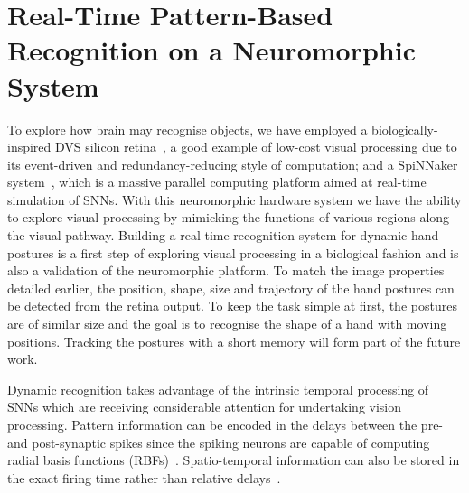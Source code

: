 \chapter{Real-Time Pattern-Based Recognition on a Neuromorphic System}
\label{cha:pattern}

To explore how brain may recognise objects, we have employed a biologically-inspired DVS silicon retina~\cite{lenero20113}, a good example of low-cost visual processing due to its event-driven and redundancy-reducing style of computation;
and a SpiNNaker system~\cite{furber2014spinnaker}, which is a massive parallel computing platform aimed at real-time simulation of SNNs. 
With this neuromorphic hardware system we have the ability to explore visual processing by mimicking the functions of various regions along the visual pathway. 
Building a real-time recognition system for dynamic hand postures is a first step of exploring visual processing in a biological fashion and is also a validation of the neuromorphic platform.
To match the image properties detailed earlier, the position, shape, size and trajectory of the hand postures can be detected from the retina output.
To keep the task simple at first, the postures are of similar size and the goal is to recognise the shape of a hand with moving positions.
Tracking the postures with a short memory will form part of the future work.

Dynamic recognition takes advantage of the intrinsic temporal processing of SNNs which are receiving considerable attention for undertaking vision processing.
Pattern information can be encoded in the delays between the pre- and post-synaptic spikes since the spiking neurons are capable of computing radial basis functions (RBFs)~\cite{hopfield1995pattern}.
Spatio-temporal information can also be stored in the exact firing time rather than relative delays~\cite{natschlager1998spatial}.


